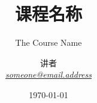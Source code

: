 \title{课程名称}
\subtitle{The Course Name}
\date{\today}
\author{讲者\\ {\scriptsize\href{mailto:someone@email.address}{\itshape someone@email.address}}}
